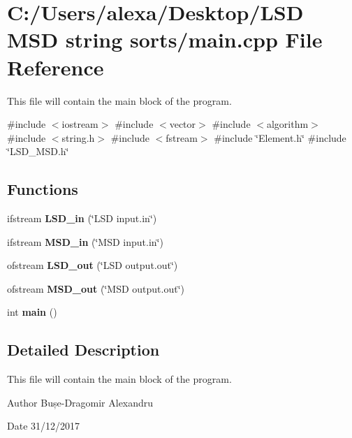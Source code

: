 \section{C\+:/\+Users/alexa/\+Desktop/\+L\+SD M\+SD string sorts/main.cpp File Reference}
\label{main_8cpp}


This file will contain the main block of the program.  


{\ttfamily \#include $<$iostream$>$}\newline
{\ttfamily \#include $<$vector$>$}\newline
{\ttfamily \#include $<$algorithm$>$}\newline
{\ttfamily \#include $<$string.\+h$>$}\newline
{\ttfamily \#include $<$fstream$>$}\newline
{\ttfamily \#include \char`\"{}Element.\+h\char`\"{}}\newline
{\ttfamily \#include \char`\"{}L\+S\+D\+\_\+\+M\+S\+D.\+h\char`\"{}}\newline
\subsection*{Functions}
\begin{DoxyCompactItemize}
\item 
ifstream \textbf{ L\+S\+D\+\_\+in} (\char`\"{}L\+SD input.\+in\char`\"{})
\item 
ifstream \textbf{ M\+S\+D\+\_\+in} (\char`\"{}M\+SD input.\+in\char`\"{})
\item 
ofstream \textbf{ L\+S\+D\+\_\+out} (\char`\"{}L\+SD output.\+out\char`\"{})
\item 
ofstream \textbf{ M\+S\+D\+\_\+out} (\char`\"{}M\+SD output.\+out\char`\"{})
\item 
int \textbf{ main} ()
\end{DoxyCompactItemize}


\subsection{Detailed Description}
This file will contain the main block of the program. 

\begin{DoxyAuthor}{Author}
Bușe-\/\+Dragomir Alexandru
\end{DoxyAuthor}
\begin{DoxyDate}{Date}
31/12/2017 
\end{DoxyDate}


